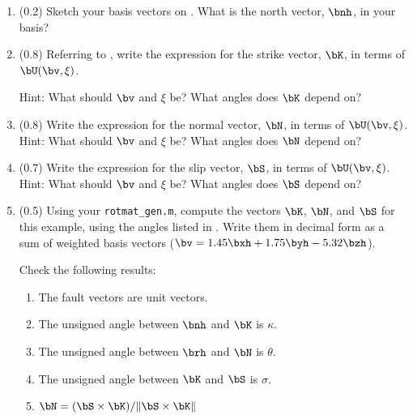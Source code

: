 \documentclass[11pt,titlepage,fleqn]{article}
\newcommand{\rotangB}{\xi}    %
\newcommand{\rotvec}{\bv}      %
\begin{document}
\begin{enumerate}
\item (0.2) Sketch your basis vectors on . What is the north vector, $\bnh$, in your basis?


\item (0.8) Referring to , write the expression for the strike vector, $\bK$, in terms of $\bU(\rotvec,\rotangB)$. %

Hint: What should $\rotvec$ and $\rotangB$ be? What angles does $\bK$ depend on?


\item (0.8) Write the expression for the normal vector, $\bN$, in terms of $\bU(\rotvec,\rotangB)$. Hint: What should $\rotvec$ and $\rotangB$ be? What angles does $\bN$ depend on?


\item (0.7) Write the expression for the slip vector, $\bS$, in terms of $\bU(\rotvec,\rotangB)$. Hint: What should $\rotvec$ and $\rotangB$ be? What angles does $\bS$ depend on?


\item (0.5) Using your \verb+rotmat_gen.m+, compute the vectors $\bK$, $\bN$, and $\bS$ for this example, using the angles listed in . Write them in decimal form as a sum of weighted basis vectors (\eg $\bv = 1.45\bxh + 1.75\byh - 5.32\bzh$).

Check the following results:
%
\begin{enumerate}
\item The fault vectors are unit vectors.
\item The unsigned angle between $\bnh$ and $\bK$ is $\kappa$.
\item The unsigned angle between $\brh$ and $\bN$ is $\theta$.
\item The unsigned angle between $\bK$ and $\bS$ is $\sigma$.
\item $\bN = (\bS \times \bK)/\| \bS \times \bK \|$
\end{enumerate}



\end{enumerate}
\end{document}
